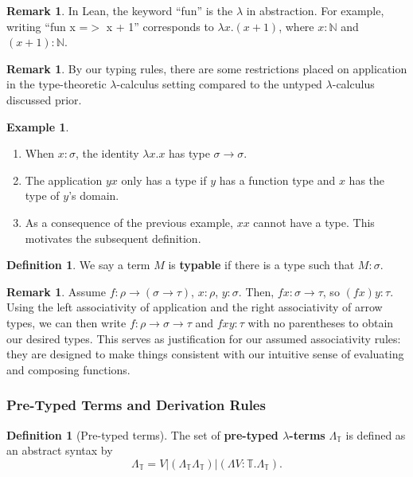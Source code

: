 \documentclass{article}
\theoremstyle{definition}
\newtheorem{definition} [theorem] {Definition}
\newtheorem{example}[theorem]{Example}
\newtheorem{remark} [theorem] {Remark}
\newcommand{\N}{\mathbb{N}}
\newcommand{\T}{\mathbb{T}}
\newcommand{\1}{\mathbb{1}}
\newcommand{\0}{\mathbb{0}}
\begin{document}
\begin{remark}
    In Lean, the keyword \enquote{fun} is the $\lambda$ in abstraction. For example, writing \enquote{fun x =$>$ x + 1} corresponds to $\lambda x. (x + 1)$, where $x : \N$ and $(x + 1) : \N$. 
\end{remark}

\begin{remark}
    By our typing rules, there are some restrictions placed on application in the type-theoretic $\lambda$-calculus setting compared to the untyped $\lambda$-calculus discussed prior. 
\end{remark}

\begin{example}
    \begin{enumerate}
        \item When $x : \sigma$, the identity $\lambda x.x$ has type $\sigma \to \sigma$. 
        \item The application $y x$ only has a type if $y$ has a function type and $x$ has the type of $y$'s domain. 
        \item As a consequence of the previous example, $x x$ cannot have a type. This motivates the subsequent definition.
    \end{enumerate}
\end{example}

\begin{definition}
    We say a term $M$ is \textbf{typable} if there is a type such that $M : \sigma$. 
\end{definition}

\begin{remark}
    Assume $f : \rho \to (\sigma \to \tau)$, $x : \rho$, $y : \sigma$. Then, $fx : \sigma \to \tau$, so $(fx)y : \tau$. Using the left associativity of application and the right associativity of arrow types, we can then write $f : \rho \to \sigma \to \tau$ and $fxy : \tau$ with no parentheses to obtain our desired types. This serves as justification for our assumed associativity rules: they are designed to make things consistent with our intuitive sense of evaluating and composing functions. 
\end{remark}

\subsubsection{Pre-Typed Terms and Derivation Rules}

\begin{definition}[Pre-typed terms]
The set of \textbf{pre-typed $\lambda$-terms} $\Lambda_\T$ is defined as an abstract syntax by
\[\Lambda_\T = V|(\Lambda_\T\Lambda_\T)|(\Lambda V:\T.\Lambda_\T).\]
\end{definition}
\end{document}
